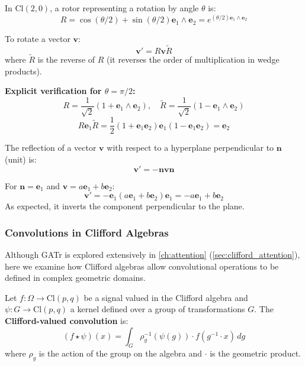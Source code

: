 \begin{example}[Rotors in 2D]\label{ex:rotores_2d}
In $\text{Cl}(2,0)$, a rotor representing a rotation by angle $\theta$ is:
\[R = \cos(\theta/2) + \sin(\theta/2) \mathbf{e}_1 \wedge \mathbf{e}_2 = e^{(\theta/2) \mathbf{e}_1 \wedge \mathbf{e}_2}\]

To rotate a vector $\mathbf{v}$:
\[\mathbf{v}' = R \mathbf{v} \widetilde{R}\]
where $\widetilde{R}$ is the reverse of $R$ (it reverses the order of multiplication in wedge products).

\textbf{Explicit verification for $\theta = \pi/2$:}
\[R = \frac{1}{\sqrt{2}}(1 + \mathbf{e}_1 \wedge \mathbf{e}_2), \quad \widetilde{R} = \frac{1}{\sqrt{2}}(1 - \mathbf{e}_1 \wedge \mathbf{e}_2)\]
\[R \mathbf{e}_1 \widetilde{R} = \frac{1}{2}(1 + \mathbf{e}_1 \mathbf{e}_2) \mathbf{e}_1 (1 - \mathbf{e}_1 \mathbf{e}_2) = \mathbf{e}_2\]
\end{example}

\begin{example}[Reflections]\label{ex:reflexiones_clifford}
The reflection of a vector $\mathbf{v}$ with respect to a hyperplane perpendicular to $\mathbf{n}$ (unit) is:
\[\mathbf{v}' = -\mathbf{n} \mathbf{v} \mathbf{n}\]

For $\mathbf{n} = \mathbf{e}_1$ and $\mathbf{v} = a\mathbf{e}_1 + b\mathbf{e}_2$:
\[\mathbf{v}' = -\mathbf{e}_1 (a\mathbf{e}_1 + b\mathbf{e}_2) \mathbf{e}_1 = -a\mathbf{e}_1 + b\mathbf{e}_2\]
As expected, it inverts the component perpendicular to the plane.
\end{example}

\subsubsection{Convolutions in Clifford Algebras}

Although GATr is explored extensively in \autoref{ch:attention} (\autoref{sec:clifford_attention}), here we examine how Clifford algebras allow convolutional operations to be defined in complex geometric domains.

\begin{definition}\label{def:conv_clifford}
Let $f: \Omega \to \text{Cl}(p,q)$ be a signal valued in the Clifford algebra and $\psi: G \to \text{Cl}(p,q)$ a kernel defined over a group of transformations $G$. The \textbf{Clifford-valued convolution} is:
\[(f \star \psi)(x) = \int_G \rho_g^{-1}(\psi(g)) \cdot f(g^{-1} \cdot x) \, dg\]
where $\rho_g$ is the action of the group on the algebra and $\cdot$ is the geometric product.
\end{definition}

